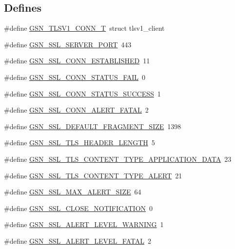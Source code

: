 \subsection*{Defines}
\begin{DoxyCompactItemize}
\item 
\#define \hyperlink{a00590_a015c2dade92f5f5d0f34f3542137f878}{GSN\_\-TLSV1\_\-CONN\_\-T}~struct tlsv1\_\-client
\item 
\#define \hyperlink{a00590_a81d295a4a574f18257bfc281d7628299}{GSN\_\-SSL\_\-SERVER\_\-PORT}~443
\item 
\#define \hyperlink{a00590_affb1611026ffad79cc89ecfd0b5ab126}{GSN\_\-SSL\_\-CONN\_\-ESTABLISHED}~11
\item 
\#define \hyperlink{a00590_ae88c363dc4ad7b48d3d8ef525ad56ef3}{GSN\_\-SSL\_\-CONN\_\-STATUS\_\-FAIL}~0
\item 
\#define \hyperlink{a00590_ad118098904d94f590753956e7ef09686}{GSN\_\-SSL\_\-CONN\_\-STATUS\_\-SUCCESS}~1
\item 
\#define \hyperlink{a00590_a52aa5f715ba7a35e30cf2ddfb349b70c}{GSN\_\-SSL\_\-CONN\_\-ALERT\_\-FATAL}~2
\item 
\#define \hyperlink{a00590_af42427aba0f8d775720b905a8474745c}{GSN\_\-SSL\_\-DEFAULT\_\-FRAGMENT\_\-SIZE}~1398
\item 
\#define \hyperlink{a00590_af010106869d3f50993c95d5194622f13}{GSN\_\-SSL\_\-TLS\_\-HEADER\_\-LENGTH}~5
\item 
\#define \hyperlink{a00590_a3bac6333c6a4a404e7c259c37660d421}{GSN\_\-SSL\_\-TLS\_\-CONTENT\_\-TYPE\_\-APPLICATION\_\-DATA}~23
\item 
\#define \hyperlink{a00590_ad535e5cacb88f5dda3ab6b82c8168d03}{GSN\_\-SSL\_\-TLS\_\-CONTENT\_\-TYPE\_\-ALERT}~21
\item 
\#define \hyperlink{a00590_a1e93d1fd8b3696527ad06eed65b27319}{GSN\_\-SSL\_\-MAX\_\-ALERT\_\-SIZE}~64
\item 
\#define \hyperlink{a00590_a2ec533316c08037994e84a483607a77d}{GSN\_\-SSL\_\-CLOSE\_\-NOTIFICATION}~0
\item 
\#define \hyperlink{a00590_ad9f116584e36b649a32776bb3841d77f}{GSN\_\-SSL\_\-ALERT\_\-LEVEL\_\-WARNING}~1
\item 
\#define \hyperlink{a00590_a79b7ec36cf70cd7b760879d85fd5f089}{GSN\_\-SSL\_\-ALERT\_\-LEVEL\_\-FATAL}~2
\end{DoxyCompactItemize}
